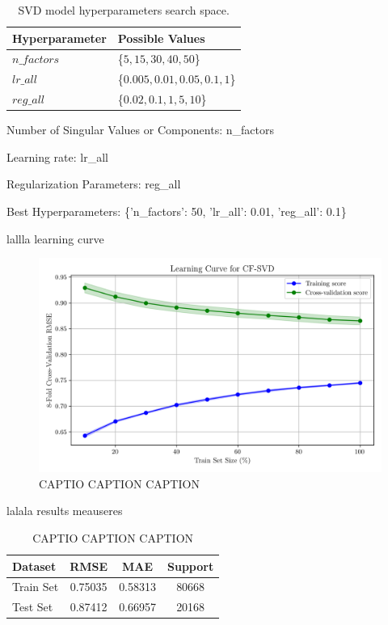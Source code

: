 \documentclass[conference]{IEEEtran}
\begin{document}
\begin{table}[H]
\centering
\caption{SVD model hyperparameters search space.}
\label{parametrosSVD}
\begin{tabular}{ll}
\toprule
\textbf{Hyperparameter} & \textbf{Possible Values} \\
\midrule
$n\_factors$ & \{$5,15,30,40,50$\} \\ 
$lr\_all$ & \{$0.005, 0.01, 0.05, 0.1, 1$\} \\ 
$reg\_all$ & \{$0.02,0.1,1,5,10$\} \\ 
\bottomrule
\end{tabular}
\end{table}


Number of Singular Values or Components: n\_factors

Learning rate: lr\_all

Regularization Parameters: reg\_all

Best Hyperparameters: \{'n\_factors': 50, 'lr\_all': 0.01, 'reg\_all': 0.1\}

lallla learning curve

\begin{figure}[H]
    \centering
    \includegraphics[width=1\linewidth]{assets/model03_learningcurve.png}
    \caption{CAPTIO CAPTION CAPTION}
    \label{fig:model03_learningcurve}
\end{figure}

lalala results meauseres

\begin{table}[H]
\centering
\caption{CAPTIO CAPTION CAPTION}
\label{tab:model03_results}
\begin{tabular}{lccc}
\toprule
\textbf{Dataset} & \textbf{RMSE} & \textbf{MAE} & \textbf{Support} \\
\midrule
Train Set & 0.75035 & 0.58313 & 80668 \\
Test Set & 0.87412 & 0.66957 & 20168 \\
\bottomrule
\end{tabular}
\end{table}
\end{document}
